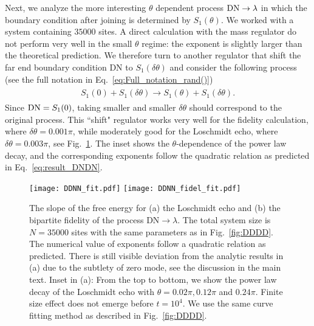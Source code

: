 Next, we analyze the more interesting $\theta$ dependent process ${\rm DN} \rightarrow \lambda$
in which the boundary condition after joining is determined by $S_1(\theta)$. We worked with a system containing $35000$ sites. A direct calculation with the mass regulator do not perform very well in the small $\theta$ regime: the exponent is slightly larger than the theoretical prediction. We therefore turn to another regulator that shift the far end boundary condition DN to $S_1( \delta \theta )$ and consider the following process (see the full notation in Eq.~\eqref{eq:Full_notation_rand()})
\begin{eqnarray}\begin{aligned}
\label{eq:approx_DNDN}
S_1(0)+S_1(\delta\theta)\rightarrow S_1(\theta)+S_1(\delta\theta).
\end{aligned}\end{eqnarray}
Since ${\rm DN} = S_1 (0 )$, taking smaller and smaller $\delta \theta$ should correspond to the original process. This ``shift" regulator works very well for the fidelity calculation, where $\delta \theta = 0.001 \pi$, while moderately good for the Loschmidt echo, where $\delta \theta = 0.003\pi$, see Fig.~\ref{fig:DDNN}. The inset shows the $\theta$-dependence of the power law decay, and the corresponding exponents follow the quadratic relation as predicted in Eq.~\eqref{eq:result_DNDN}. %

\begin{figure}
  \centering
\texttt{[image: DDNN\_fit.pdf]}
\texttt{[image: DDNN\_fidel\_fit.pdf]}
    \caption{The slope of the free energy for (a) the Loschmidt echo and (b) the bipartite fidelity of the process $\text{DN} \rightarrow \lambda$. {\iffalse in Eq.~\eqref{eq:DNDN}\fi} The total system size is $N=35000$ sites with the same parameters as in Fig.~\ref{fig:DDDD}. The numerical value of exponents follow a quadratic relation as predicted. There is still visible deviation from the analytic results in (a) due to the subtlety of zero mode, see the discussion in the main text. Inset in (a): From the top to bottom, we show the power law decay of the Loschmidt echo with $\theta=0.02\pi, 0.12\pi $ and $0.24\pi$. Finite size effect does not emerge before $t=10^{4}$. We use the same curve fitting method as described in Fig.~\ref{fig:DDDD}.}
      \label{fig:DDNN}
\end{figure}


